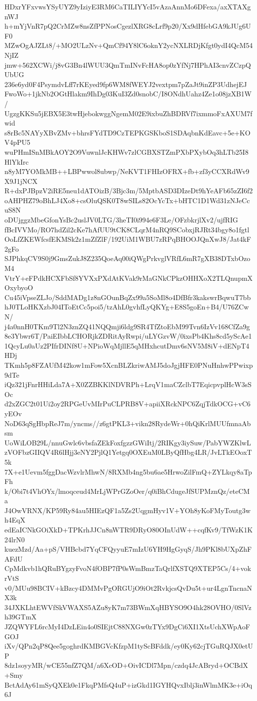 HDxrYFxvwsYSyUYZ9yIziyE3RM6CaTILIYYcI5vAzaAnnMo6DFexa/axXTAXgnWJ
h+mYjVnR7pQ2CrMZw8nsZfPPNosCgezlXRG8cLrf9p20/Xx9dHfebGA9kJUg6UF0
MZwOgAJZLt8/+MO2ULzNv+QmCf94Y8lC6oknY2ycNXLRDjKfgt0ydI4QcM54NjIZ
jmw+562XCWi/j8vG3Bn4lWUU3QmTmINvFcHA8op0zYfNj7HPhAI3cnvZCzpQUbUG
236e6yd0F4PsymdvLff7rKEyed9fp6WM8fWEYJ2vextpm7pZaJt9inZP3UdhejEJ
FwoWo+1jkNb2OGtHlakm9IhDg03KuI3Zd0snobC/I8ONdhUahz4Ze1o08jzXB1W/
UgzgKKSu5jEBX5E3twHjebokwggNgemM02E9ixbuZhBDRVf7ixmmoFxAXUM7fwid
s8rBc5NAYyXBvZMv+bhrsFYdTD9CzTEPKGSKboS1SDAqbnKdEavc+5e+KOV4pPU5
wuPHmISnMBkAOY2O9VuwnlJcKHWv7zlCGBXSTZmPXbPXybOq3hLTb25I8HlYkIrc
n8yM7YOMkMB++LBPwwol8ubwp/NeKVT1FHIzOFRX+fb+zf3yCCXRdWv9X9J1jNCX
R+dxPJBpzV2iRE5neu1dATOizB/3Bjc3m/5MptbASD3DIzeDt9hYeAFb65zZI6f2
oAHPHZ79oBhLJ4Xo8+csOluQSK0T8wSILs82OcYcTx+bHTC1D1Wd31zNJeCcuS8N
oDUjggzMbeGfonYsBc2uslJV0LTG/3heTI0i994e6F3Le/OFzbkrjlXv2/ujfRIG
fBcIVVMo/RO7hdZil2cKe7hAfUU9tCK8CLqrM4nRQ9SCobxjRJRt34bgy8o1fgtl
OoLfZKEWfcsfEKMSk2z1mZfZlF/192UiM1WBU7zRPqBHOOJQnXwJ8/Jat4kF2gFo
SJPhkqCV9S0j9GmsZukJ8Z235QoeAq00iQWgPrkvglVRfL6mR7gXB38DTxbOzoM4
VtrY+eFPdkHCXFbSf8YVXxPXdAtKVak9rMaGNkCPkzOHHXoX2TLQnupmXOxybyoO
Cu45iVpseZLJo/SddMADg1z8nGOunBqZx99a5SoMl8o4DfBfr3kakswrBqwuT7bb
hJ0TLoHKXzbJ04IToEtCc5poi5/tzAhL0gvhfLyQKYg+E8S5goEn+B4/U76ZCwN/
j4a0nnH0TKm9Tl2N3znZQ41NQQmji6ldg9SR4TfZtoEbM99Tvn6IzVv168CfZa9g
8e3Ybwr6T/PaiEIbbLCHORjkZDRitAyRwpi/uLYGzvW/0ixsPb4Khs8cd5yScAe1
1QcyLu0aUz2PIfrDINf8U+NPioWqMjllE5qMHxhcutDmv6sNV5M8iV+dENpT4HDj
TKmh5p8FZAUfM42kow1mFow5XcnBLZkriwAMJ5doJgjHFE0PNuHnhwPPwixp9dTe
iQz321jFnrHHiLda7A+X0ZZBKKlNDVRPh+LrqV1maCZclbT7EqicpvplHcW3sSOc
d2xZGC2t01Ui2oy2RPGeUvMIrPuCLPRB8V+apiiXRckNPC6ZqjTdkOCG+vC6yEOv
NoD63qSgHbpReJ7m/yncms//z6gtPKL3+vikn28RydeWr+0hQiKrlMUUfmnaAbsm
UoWiLOB29L/nnuGwlc6vbsfaZEkFoxfgzzGWiItj/2RIKgy3iySuw/PabYWZKlwL
zVOFbzGIIQV4R6lHjj3eNY2PjlQ1Yetgq0OXEuM0LByQfHbg4LR/JvLTkEOoxT5k
7X+e1Uevm5fggDacWzvlrMhwN/8RXMb4ng5bu6ae5HrwoZilFmQ+ZYLkqy8aTpFh
k/Obi7t4VhOYx/lmoqceud4MrLjWPrGZoOer/q0iBhCdugeJfSUPMznQz/eteCMa
J4OwVRNX/KP59Ry84au5HIEzQF1a5Zs2UqgmHyv1V+YOh8yKoFMyToutg3wh4EqX
edEaICNkGOiXkD+TPKrhJJCn8nWTR9DRyO80OInUdW++cqfKv9/TfWzK1K24lrN0
kuezMzd/Aa+pS/VHBcbd7YqCFQyyuE7mIzU6YH9HgGyqS/Jh9PKl8bUXpZhFAFdU
CpMdkvb1hQRuBYgzyFvoN4fOBP7fP0sWmBmzTaQrlfXSTQ9XTEP5Cs/4+vokrVtS
v0/MUu98BCIV+kBzcy4DMMvPgORGUjO9iOt2RvkjcsQvDu5t+ur4LgnTncnaNX3k
34JXKLhtEWVfSkVWAXS5AZu8yK7m73BWmXqHBYSO9O4hk28OVHO/0SlVzh39GTmX
JZQWYFL6rcMyI4DzLEin4o0SIEjtC88NXGw0zTYx9DgCi6XI1XtsUchXWpAoFGOJ
iXv/QPn2qP8Qee5goghrdKMBGVcKfzpM1tyScBFddk/ey0Ky62cjTGuRQJX0etUP
8dz1soyyMR/wCE55nfZ7QM/a6XcOD+OivICDl7Mpn/czdq4JcABryd+OCBdX+Smy
BctAdAy61mSyQXEk0e1FkqPMfsQ4uP+izGkd1IGYHQvxIblj3inWlmMK3e+iOq6J
